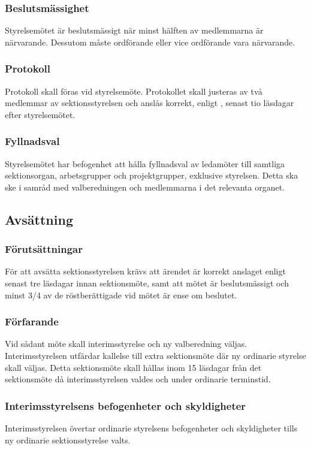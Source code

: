 \subsubsection{Beslutsmässighet}
Styrelsemötet är beslutsmässigt när minst hälften av medlemmarna är närvarande. Dessutom måste ordförande eller vice ordförande vara närvarande.

\subsubsection{Protokoll}
Protokoll skall föras vid styrelsemöte. Protokollet skall justeras av två medlemmar av sektionsstyrelsen och anslås korrekt, enligt , senast tio läsdagar efter styrelsemötet.

\subsubsection{Fyllnadsval}
Styrelsemötet har befogenhet att hålla fyllnadsval av ledamöter till samtliga sektionsorgan, arbetsgrupper och projektgrupper, exklusive styrelsen. Detta ska ske i samråd med valberedningen och medlemmarna i det relevanta organet.

\subsection{Avsättning}

\subsubsection{Förutsättningar}
För att avsätta sektionsstyrelsen krävs att ärendet är korrekt anslaget enligt  senast tre läsdagar innan sektionsmöte, samt att mötet är beslutsmässigt och minst 3/4 av de röstberättigade vid mötet är ense om beslutet. 

\subsubsection{Förfarande}
Vid sådant möte skall interimsstyrelse och ny valberedning väljas. Interimsstyrelsen utfärdar kallelse till extra sektionsmöte där ny ordinarie styrelse skall väljas. Detta sektionsmöte skall hållas inom 15 läsdagar från det sektionsmöte då interimsstyrelsen valdes och under ordinarie terminstid.

\subsubsection{Interimsstyrelsens befogenheter och skyldigheter}
Interimsstyrelsen övertar ordinarie styrelsens befogenheter och skyldigheter tills ny ordinarie sektionsstyrelse valts.


